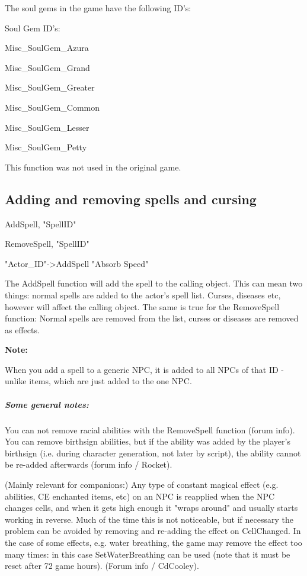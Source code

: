 \documentclass[
]{article}
\begin{document}
The soul gems in the game have the following ID's:

Soul Gem ID's:

Misc\_SoulGem\_Azura

Misc\_SoulGem\_Grand

Misc\_SoulGem\_Greater

Misc\_SoulGem\_Common

Misc\_SoulGem\_Lesser

Misc\_SoulGem\_Petty

This function was not used in the original game.

\hypertarget{adding-and-removing-spells-and-cursing}{%
\subsection{\texorpdfstring{\hfill\break
Adding and removing spells and cursing
}{ Adding and removing spells and cursing }}\label{adding-and-removing-spells-and-cursing}}

AddSpell, "SpellID"

RemoveSpell, "SpellID"

"Actor\_ID"-\textgreater AddSpell "Absorb Speed"

The AddSpell function will add the spell to the calling object. This can
mean two things: normal spells are added to the actor's spell list.
Curses, diseases etc, however will affect the calling object. The same
is true for the RemoveSpell function: Normal spells are removed from the
list, curses or diseases are removed as effects.

\textbf{Note:}

When you add a spell to a generic NPC, it is added to all NPCs of that
ID - unlike items, which are just added to the one NPC.

\hypertarget{some-general-notes}{%
\subparagraph{Some general notes:}\label{some-general-notes}}

You can not remove racial abilities with the RemoveSpell function (forum
info). You can remove birthsign abilities, but if the ability was added
by the player's birthsign (i.e. during character generation, not later
by script), the ability cannot be re-added afterwards (forum info /
Rocket).

(Mainly relevant for companions:) Any type of constant magical effect
(e.g. abilities, CE enchanted items, etc) on an NPC is reapplied when
the NPC changes cells, and when it gets high enough it "wraps around"
and usually starts working in reverse. Much of the time this is not
noticeable, but if necessary the problem can be avoided by removing and
re-adding the effect on CellChanged. In the case of some effects, e.g.
water breathing, the game may remove the effect too many times: in this
case SetWaterBreathing can be used (note that it must be reset after 72
game hours). (Forum info / CdCooley).
\end{document}
